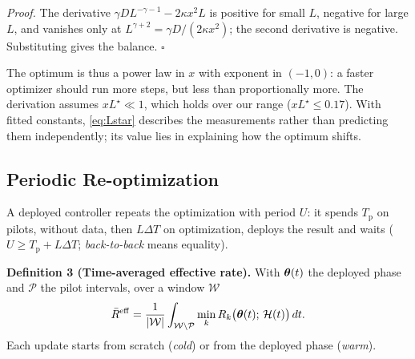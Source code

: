 \emph{Proof.} The derivative $\gamma D L^{-\gamma-1} - 2\kappa x^2 L$ is positive for small $L$, negative for large $L$, and vanishes only at $L^{\gamma+2}=\gamma D/(2\kappa x^2)$; the second derivative is negative. Substituting gives the balance. \hfill$\square$

The optimum is thus a power law in $x$ with exponent in $(-1,0)$: a faster optimizer should run more steps, but less than proportionally more. The derivation assumes $xL^\star \ll 1$, which holds over our range ($xL^\star\le 0.17$). With fitted constants, \eqref{eq:Lstar} describes the measurements rather than predicting them independently; its value lies in explaining how the optimum shifts.

\subsection{Periodic Re-optimization}
A deployed controller repeats the optimization with period $U$: it spends $T_{\mathrm{p}}$ on pilots, without data, then $L\Delta T$ on optimization, deploys the result and waits ($U \ge T_{\mathrm{p}}+L\Delta T$; \emph{back-to-back} means equality).

\textbf{Definition 3 (Time-averaged effective rate).} With $\boldsymbol{\theta}(t)$ the deployed phase and $\mathcal{P}$ the pilot intervals, over a window $\mathcal{W}$
\begin{equation}
    \bar{R}^{\mathrm{eff}} = \frac{1}{|\mathcal{W}|}\int_{\mathcal{W}\setminus\mathcal{P}} \min_k R_k\big(\boldsymbol{\theta}(t);\,\mathcal{H}(t)\big)\,dt .
    \label{eq:time_avg}
\end{equation}
Each update starts from scratch (\emph{cold}) or from the deployed phase (\emph{warm}).
